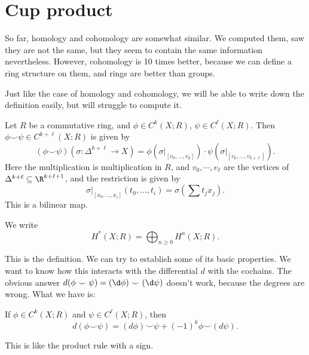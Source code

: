 \documentclass[a4paper]{article}
\theoremstyle{definition}
\begin{document}
\section{Cup product}
So far, homology and cohomology are somewhat similar. We computed them, saw they are not the same, but they seem to contain the same information nevertheless. However, cohomology is 10 times better, because we can define a ring structure on them, and rings are better than groups.

Just like the case of homology and cohomology, we will be able to write down the definition easily, but will struggle to compute it.

\begin{defi}\index{$\smile$}
  Let $R$ be a commutative ring, and $\phi \in C^k(X; R)$, $\psi \in C^\ell(X; R)$. Then $\phi \smile \psi \in C^{k + \ell}(X; R)$ is given by
  \[
    (\phi \smile \psi)(\sigma: \Delta^{k + \ell} \to X) = \phi(\sigma|_{[v_0, \ldots, v_k]}) \cdot \psi(\sigma|_{[v_k, \ldots, v_{k + \ell}]}).
  \]
  Here the multiplication is multiplication in $R$, and $v_0, \cdots, v_\ell$ are the vertices of $\Delta^{k + \ell} \subseteq \R^{k + \ell + 1}$, and the restriction is given by
  \[
    \sigma|_{[x_0, \ldots, x_i]} (t_0, \ldots, t_i) = \sigma\left(\sum t_j x_j\right).
  \]
  This is a bilinear map.
\end{defi}

\begin{notation}
  We write
  \[
    H^*(X; R) = \bigoplus_{n \geq 0} H^n(X; R).
  \]
\end{notation}
This is the definition. We can try to establish some of its basic properties. We want to know how this interacts with the differential $d$ with the cochains. The obvious answer $d(\phi \smile \psi) = (\d \phi) \smile (\d \psi)$ doesn't work, because the degrees are wrong. What we have is:

\begin{lemma}
  If $\phi \in C^k(X; R)$ and $\psi \in C^\ell(X; R)$, then
  \[
    d (\phi \smile \psi) = (d \phi)\smile \psi + (-1)^k \phi\smile(d \psi).
  \]
\end{lemma}
This is like the product rule with a sign.
\end{document}
